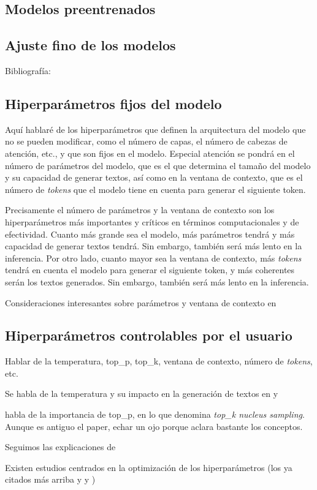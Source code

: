 \subsection{Modelos preentrenados}
\subsection{Ajuste fino de los modelos}
Bibliografía: \cite{chamandFinetuneYourClassifier2022}

\subsection{Hiperparámetros fijos del modelo}
Aquí hablaré de los hiperparámetros que definen la arquitectura del modelo que no se pueden modificar, como el número de capas, el número de cabezas de atención, etc., y que son fijos en el modelo. Especial atención se pondrá en el número de parámetros del modelo, que es el que determina el tamaño del modelo y su capacidad de generar textos, así como en la ventana de contexto, que es el número de \textit{tokens} que el modelo tiene en cuenta para generar el siguiente token.

Precisamente el número de parámetros y la ventana de contexto son los hiperparámetros más importantes y críticos en términos computacionales y de efectividad. Cuanto más grande sea el modelo, más parámetros tendrá y más capacidad de generar textos tendrá. Sin embargo, también será más lento en la inferencia. Por otro lado, cuanto mayor sea la ventana de contexto, más \textit{tokens} tendrá en cuenta el modelo para generar el siguiente token, y más coherentes serán los textos generados. Sin embargo, también será más lento en la inferencia.

Consideraciones interesantes sobre parámetros y ventana de contexto en \cite{gonzaloAsomandonosVentanaContextual2023}

\subsection{Hiperparámetros controlables por el usuario}
\label{sec:hiperparametros_controlables}
Hablar de la temperatura, top\_p, top\_k, ventana de contexto, número de \textit{tokens}, etc. 

Se habla de la temperatura y su impacto en la generación de textos en \cite{holtzmanCuriousCaseNeural2020} y \cite{chamandFinetuneYourClassifier2022}

\cite{holtzmanCuriousCaseNeural2020} habla de la importancia de top\_p, en lo que denomina \textit{top\_k nucleus sampling}. Aunque es antiguo el paper, echar un ojo porque aclara bastante los conceptos.

Seguimos las explicaciones de \cite{rothmanTransformersNaturalLanguage2021}

Existen estudios centrados en la optimización de los hiperparámetros (los ya citados más arriba y \cite{wangCostEffectiveHyperparameterOptimization2023} y \cite{wangHyperparameterOptimizationAlgorithm2022})

